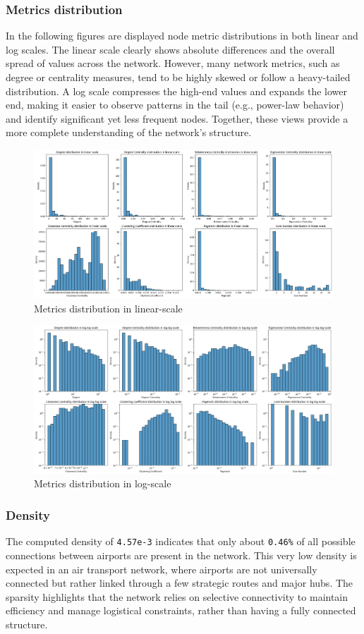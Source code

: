 \documentclass[12pt]{article}
\begin{document}
    \subsubsection{Metrics distribution}
    In the following figures are displayed node metric distributions in both linear and log scales. The linear scale clearly shows absolute differences and the overall spread of values across the network. However, many network metrics, such as degree or centrality measures, tend to be highly skewed or follow a heavy-tailed distribution. A log scale compresses the high-end values and expands the lower end, making it easier to observe patterns in the tail (e.g., power-law behavior) and identify significant yet less frequent nodes. Together, these views provide a more complete understanding of the network's structure.
    \begin{figure}[H]
        \centering
        \includegraphics[width=0.8\linewidth]{img/metrics_output}
        \caption{Metrics distribution in linear-scale}
    \end{figure}

    \begin{figure}[H]
        \centering
        \includegraphics[width=0.8\linewidth]{img/metrics_logscale_output}
        \caption{Metrics distribution in log-scale}
    \end{figure}

    \subsubsection{Density}
    The computed density of \texttt{4.57e-3} indicates that only about \texttt{0.46\%} of all possible connections between airports are present in the network. This very low density is expected in an air transport network, where airports are not universally connected but rather linked through a few strategic routes and major hubs. The sparsity highlights that the network relies on selective connectivity to maintain efficiency and manage logistical constraints, rather than having a fully connected structure.
\end{document}
